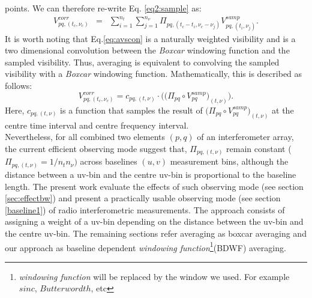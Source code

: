 \documentclass[useAMS,usenatbib]{mn2e}
\begin{document}
points. We can therefore re-write Eq. \ref{eq2:sample} as:
\begin{eqnarray}
V_{pq,(t_c,\nu_c)}^{corr}&=&\sum_{i=1}^{n_t}\sum_{j=1}^{n_{\nu}}\Pi_{pq,(t_c - t_i,\nu_c -\nu_j)}V_{pq,(t_i,\nu_j)}^{samp}. 
\label{eq:avscon}
\end{eqnarray}
It is worth noting that Eq.\ref{eq:avscon} is a naturally weighted visibility and is a two dimensional convolution between the 
\textit{Boxcar} windowing function and the sampled visibility. Thus, averaging is equivalent to convolving the 
sampled 
visibility with a \textit{Boxcar} windowing function. Mathematically, this is described as follows:
\begin{equation}
 V_{pq,(t_c,\nu_c)}^{corr}=c_{pq,(t,\nu)}\cdot\Bigg(\Big(\Pi_{pq}\circ V_{pq}^{samp}\Big)_{(t,\nu)}\Bigg). \label{f4}
\end{equation}
Here, $c_{pq,(t,\nu)}$ is a function that samples the result of $\Big(\Pi_{pq}\circ V_{pq}^{samp}\Big)_{(t,\nu)}$ at 
the centre time interval and centre frequency interval. 
\\%
Nevertheless, for all combined two elements $(p,q)$ of an interferometer array, the current efficient observing mode suggest that, 
$\Pi_{pq,(t,\nu)}$ remain constant ($\Pi_{pq,(t,\nu)}=1/n_t n_{\nu})$ across baselines $(u,v)$ measurement bins, although the distance 
between a uv-bin and the centre uv-bin is proportional to the baseline length. The present work evaluate  the
effects of such observing mode (see section \ref{sec:effectbw}) and present a practically usable
observing mode (see section \ref{baseline1}) of 
radio interferometric measurements. The approach consists of assigning a weight of a uv-bin depending on the distance between the uv-bin 
and the centre uv-bin. The remaining sections refer averaging as boxcar 
averaging and our approach as baseline dependent \textit{windowing function}\footnote{\textit{windowing function} will be replaced by the 
window we used. For example $sinc$, $Butterwordth$, etc}(BDWF) averaging.
\end{document}

